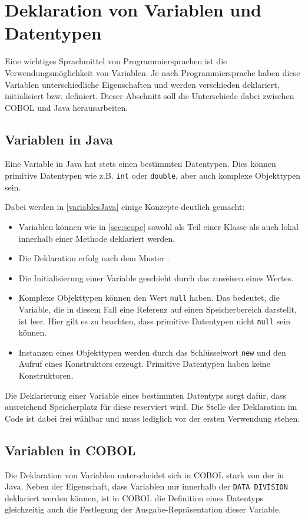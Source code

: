\section{Deklaration von Variablen und Datentypen} \label{variables}
Eine wichtiges Sprachmittel von Programmiersprachen ist die Verwendungsmöglichkeit von Variablen. Je nach Programmiersprache haben diese Variablen unterschiedliche Eigenschaften und werden verschieden deklariert, initialisiert bzw. definiert. Dieser Abschnitt soll die Unterschiede dabei zwischen COBOL und Java herausarbeiten.

\subsection*{Variablen in Java}
Eine Variable in Java hat stets einen bestimmten Datentypen. Dies können primitive Datentypen wie z.B. \texttt{int} oder \texttt{double}, aber auch komplexe Objekttypen sein.

Dabei werden in \autoref{variablesJava} einige Konzepte deutlich gemacht:
\begin{itemize}
 \item Variablen können wie in \autoref{sec:scope} sowohl als Teil einer Klasse als auch lokal innerhalb einer Methode deklariert werden. 
 \item Die Deklaration erfolg nach dem Muster .
 \item Die Initialisierung einer Variable geschieht durch das zuweisen eines Wertes.
 \item Komplexe Objekttypen können den Wert \texttt{null} haben. Das bedeutet, die Variable, die in diesem Fall eine Referenz auf einen Speicherbereich darstellt, ist leer. Hier gilt es zu beachten, dass primitive Datentypen nicht \texttt{null} sein können.
 \item Instanzen eines Objekttypen werden durch das Schlüsselwort \texttt{new} und den Aufruf eines Konstruktors erzeugt. Primitive Datentypen haben keine Konstruktoren.
\end{itemize}
Die Deklarierung einer Variable eines bestimmten Datentyps sorgt dafür, dass ausreichend Speicherplatz für diese reserviert wird. Die Stelle der Deklaration im Code ist dabei frei wählbar und muss lediglich vor der ersten Verwendung stehen.

\subsection*{Variablen in COBOL}
Die Deklaration von Variablen unterscheidet sich in COBOL stark von der in Java. Neben der Eigenschaft, dass Variablen nur innerhalb der \texttt{DATA DIVISION} deklariert werden können, ist in COBOL die Definition eines Datentyps gleichzeitig auch die Festlegung der Ausgabe-Repräsentation dieser Variable. 

